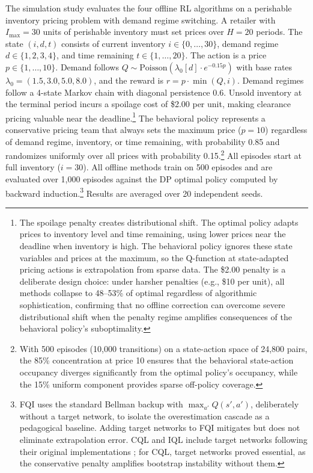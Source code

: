 The simulation study evaluates the four offline RL algorithms on a perishable inventory pricing problem with demand regime switching. A retailer with $I_{\max} = 30$ units of perishable inventory must set prices over $H = 20$ periods. The state $(i, d, t)$ consists of current inventory $i \in \{0, \ldots, 30\}$, demand regime $d \in \{1, 2, 3, 4\}$, and time remaining $t \in \{1, \ldots, 20\}$. The action is a price $p \in \{1, \ldots, 10\}$. Demand follows $Q \sim \text{Poisson}(\lambda_0[d] \cdot e^{-0.15 p})$ with base rates $\lambda_0 = (1.5, 3.0, 5.0, 8.0)$, and the reward is $r = p \cdot \min(Q, i)$. Demand regimes follow a 4-state Markov chain with diagonal persistence 0.6. Unsold inventory at the terminal period incurs a spoilage cost of \$2.00 per unit, making clearance pricing valuable near the deadline.\footnote{The spoilage penalty creates distributional shift. The optimal policy adapts prices to inventory level and time remaining, using lower prices near the deadline when inventory is high. The behavioral policy ignores these state variables and prices at the maximum, so the Q-function at state-adapted pricing actions is extrapolation from sparse data. The \$2.00 penalty is a deliberate design choice: under harsher penalties (e.g., \$10 per unit), all methods collapse to 48--53\% of optimal regardless of algorithmic sophistication, confirming that no offline correction can overcome severe distributional shift when the penalty regime amplifies consequences of the behavioral policy's suboptimality.} The behavioral policy represents a conservative pricing team that always sets the maximum price ($p = 10$) regardless of demand regime, inventory, or time remaining, with probability 0.85 and randomizes uniformly over all prices with probability 0.15.\footnote{With 500 episodes (10,000 transitions) on a state-action space of 24,800 pairs, the 85\% concentration at price 10 ensures that the behavioral state-action occupancy diverges significantly from the optimal policy's occupancy, while the 15\% uniform component provides sparse off-policy coverage.} All episodes start at full inventory ($i = 30$). All offline methods train on 500 episodes and are evaluated over 1,000 episodes against the DP optimal policy computed by backward induction.\footnote{FQI uses the standard Bellman backup with $\max_{a'} Q(s', a')$, deliberately without a target network, to isolate the overestimation cascade as a pedagogical baseline. Adding target networks to FQI mitigates but does not eliminate extrapolation error. CQL and IQL include target networks following their original implementations \citep{Kumar2020, Kostrikov2022}; for CQL, target networks proved essential, as the conservative penalty amplifies bootstrap instability without them.} Results are averaged over 20 independent seeds.

